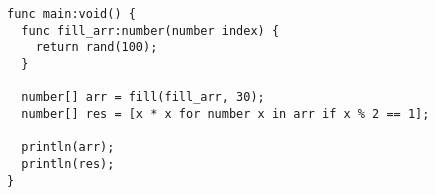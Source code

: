 \begin{verbatim}
func main:void() {
  func fill_arr:number(number index) {
    return rand(100);
  }

  number[] arr = fill(fill_arr, 30);
  number[] res = [x * x for number x in arr if x % 2 == 1];

  println(arr);
  println(res);
}
\end{verbatim}